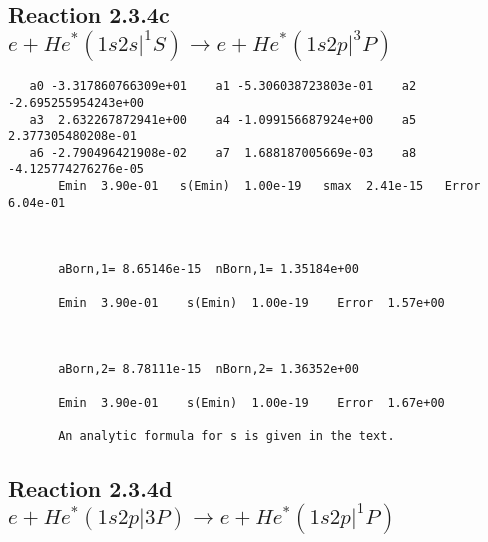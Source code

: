 \documentclass[12pt]{article}
\begin{document}
\newpage
\subsection{
Reaction 2.3.4c $e + He^*(1s2s|^1S) \rightarrow e + He^*(1s2p|^3P)$}

















\begin{small}\begin{verbatim}
   a0 -3.317860766309e+01    a1 -5.306038723803e-01    a2 -2.695255954243e+00
   a3  2.632267872941e+00    a4 -1.099156687924e+00    a5  2.377305480208e-01
   a6 -2.790496421908e-02    a7  1.688187005669e-03    a8 -4.125774276276e-05
       Emin  3.90e-01   s(Emin)  1.00e-19   smax  2.41e-15   Error  6.04e-01



       aBorn,1= 8.65146e-15  nBorn,1= 1.35184e+00

       Emin  3.90e-01    s(Emin)  1.00e-19    Error  1.57e+00



       aBorn,2= 8.78111e-15  nBorn,2= 1.36352e+00

       Emin  3.90e-01    s(Emin)  1.00e-19    Error  1.67e+00

       An analytic formula for s is given in the text.
\end{verbatim}\end{small}




\newpage
\subsection{
Reaction 2.3.4d $e + He^*(1s2p|3P) \rightarrow e + He^*(1s2p|^1P)$}






\end{document}

